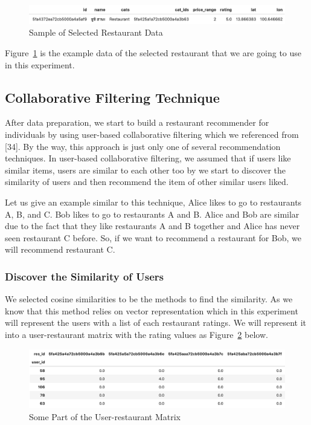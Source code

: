 \documentclass[12pt,oneside,openright,a4paper]{cpe-english-project}
\begin{document}
\begin{figure}[H]\centering
\includegraphics[width=350pt]{./images/4SampleofSelectedRestaurantData.png}
\caption{Sample of Selected Restaurant Data}\label{fig:4SampleofSelectedRestaurantData}
\end{figure}

Figure~\ref{fig:4SampleofSelectedRestaurantData} is the example data of the selected restaurant that we are going to use in this experiment.

\subsection{Collaborative Filtering Technique}

After data preparation, we start to build a restaurant recommender for individuals by using user-based collaborative filtering which we referenced from [34]. By the way, this approach is just only one of several recommendation techniques. In user-based collaborative filtering, we assumed that if users like similar items, users are similar to each other too by we start to discover the similarity of users and then recommend the item of other similar users liked.

Let us give an example similar to this technique, Alice likes to go to restaurants A, B, and C. Bob likes to go to restaurants A and B. Alice and Bob are similar due to the fact that they like restaurants A and B together and Alice has never seen restaurant C before. So, if we want to recommend a restaurant for Bob, we will recommend restaurant C.

\subsubsection{Discover the Similarity of Users}

We selected cosine similarities to be the methods to find the similarity. As we know that this method relies on vector representation which in this experiment will represent the users with a list of each restaurant ratings. We will represent it into a user-restaurant matrix with the rating values as Figure~\ref{fig:4SomePartoftheUserrestaurantMatrix} below.

\begin{figure}[H]\centering
\includegraphics[width=350pt]{./images/4SomePartoftheUserrestaurantMatrix.png}
\caption{Some Part of the User-restaurant Matrix}\label{fig:4SomePartoftheUserrestaurantMatrix}
\end{figure}
\end{document}
